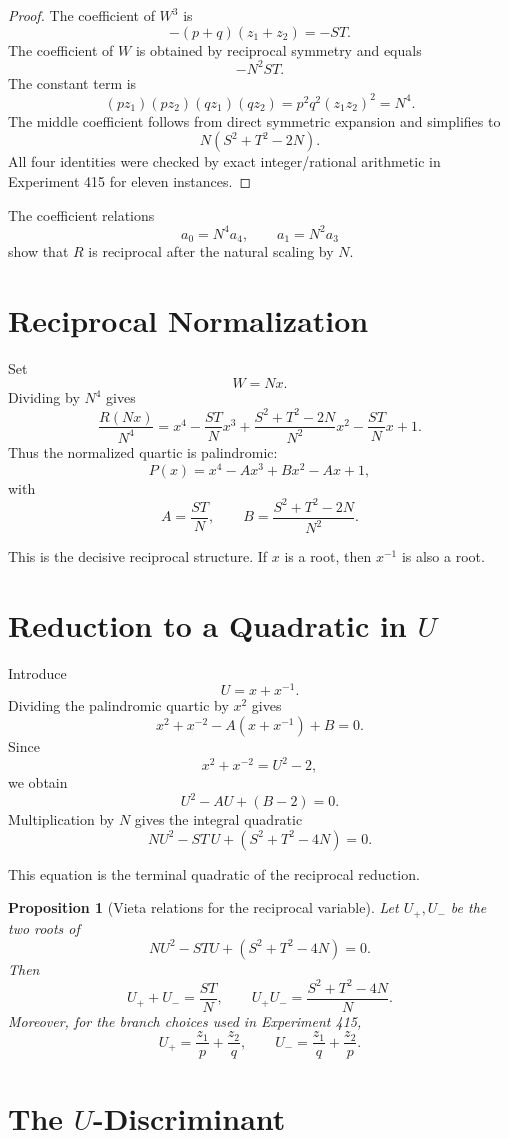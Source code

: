 \documentclass[11pt,a4paper]{article}
\newtheorem{proposition}[theorem]{Proposition}
\theoremstyle{definition}
\theoremstyle{remark}
\begin{document}
\begin{proof}
The coefficient of $W^3$ is
\[
-(p+q)(z_1+z_2)=-ST.
\]
The coefficient of $W$ is obtained by reciprocal symmetry and equals
\[
-N^2ST.
\]
The constant term is
\[
(pz_1)(pz_2)(qz_1)(qz_2)
=p^2q^2(z_1z_2)^2=N^4.
\]
The middle coefficient follows from direct symmetric expansion and simplifies to
\[
N(S^2+T^2-2N).
\]
All four identities were checked by exact integer/rational arithmetic in Experiment 415 for eleven instances.
\end{proof}

The coefficient relations
\[
a_0=N^4a_4,
\qquad
 a_1=N^2a_3
\]
show that $R$ is reciprocal after the natural scaling by $N$.

\section{Reciprocal Normalization}

Set
\[
W=Nx.
\]
Dividing by $N^4$ gives
\[
\frac{R(Nx)}{N^4}
=x^4-\frac{ST}{N}x^3
+\frac{S^2+T^2-2N}{N^2}x^2
-\frac{ST}{N}x+1.
\]
Thus the normalized quartic is palindromic:
\[
P(x)=x^4-Ax^3+Bx^2-Ax+1,
\]
with
\[
A=\frac{ST}{N},
\qquad
B=\frac{S^2+T^2-2N}{N^2}.
\]

This is the decisive reciprocal structure. If $x$ is a root, then $x^{-1}$ is also a root.

\section{Reduction to a Quadratic in \texorpdfstring{$U$}{U}}

Introduce
\[
\boxed{U=x+x^{-1}.}
\]
Dividing the palindromic quartic by $x^2$ gives
\[
x^2+x^{-2}-A(x+x^{-1})+B=0.
\]
Since
\[
x^2+x^{-2}=U^2-2,
\]
we obtain
\[
U^2-AU+(B-2)=0.
\]
Multiplication by $N$ gives the integral quadratic
\[
\boxed{
NU^2-ST\,U+(S^2+T^2-4N)=0.
}
\]

This equation is the terminal quadratic of the reciprocal reduction.

\begin{proposition}[Vieta relations for the reciprocal variable]
Let $U_+,U_-$ be the two roots of
\[
NU^2-STU+(S^2+T^2-4N)=0.
\]
Then
\[
U_++U_- = \frac{ST}{N},
\qquad
U_+U_- = \frac{S^2+T^2-4N}{N}.
\]
Moreover, for the branch choices used in Experiment 415,
\[
\boxed{
U_+=\frac{z_1}{p}+\frac{z_2}{q},
\qquad
U_- = \frac{z_1}{q}+\frac{z_2}{p}.
}
\]
\end{proposition}

\section{The \texorpdfstring{$U$}{U}-Discriminant}
\end{document}
